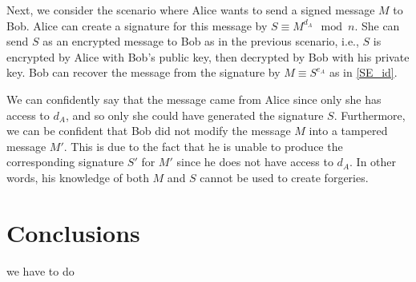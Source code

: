\documentclass[10pt]{article}
\begin{document}
Next, we consider the scenario where Alice wants to send a signed message $M$ to Bob. Alice can create a signature for this message by $S \equiv M^{d_A} \mod n$. She can send $S$ as an encrypted message to Bob as in the previous scenario, i.e., $S$ is encrypted by Alice with Bob's public key, then decrypted by Bob with his private key. Bob can recover the message from the signature by $M \equiv S^{e_A}$ as in \ref{SE_id}. 

We can confidently say that the message came from Alice since only she has access to $d_A$, and so only she could have generated the signature $S$. Furthermore, we can be confident that Bob did not modify the message $M$ into a tampered message $M'$. This is due to the fact that he is unable to produce the corresponding signature $S'$ for $M'$ since he does not have access to $d_A$. In other words, his knowledge of both $M$ and $S$ cannot be used to create forgeries.


\section{Conclusions}
we have to do



\end{document}
